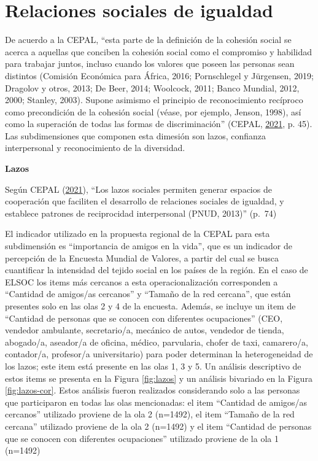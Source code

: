 \documentclass[
  12pt,
]{book}
\begin{document}
\hypertarget{relaciones-sociales-de-igualdad}{%
\section{Relaciones sociales de igualdad}\label{relaciones-sociales-de-igualdad}}

De acuerdo a la CEPAL, ``esta parte de la definición de la cohesión social se acerca a aquellas que conciben la cohesión social como el compromiso y habilidad para trabajar juntos, incluso cuando los valores que poseen las personas sean distintos (Comisión Económica para África, 2016; Pornschlegel y Jürgensen, 2019; Dragolov y otros, 2013; De Beer, 2014; Woolcock, 2011; Banco Mundial, 2012, 2000; Stanley, 2003). Supone asimismo el principio de reconocimiento recíproco como precondición de la cohesión social (véase, por ejemplo, Jenson, 1998), así como la superación de todas las formas de discriminación'' (CEPAL, \protect\hyperlink{ref-cepal_cohesion_2021}{2021}, p. 45). Las subdimensiones que componen esta dimesión son lazos, confianza interpersonal y reconocimiento de la diversidad.

\textbf{Lazos}

Según CEPAL (\protect\hyperlink{ref-cepal_cohesion_2021}{2021}), ``Los lazos sociales permiten generar espacios de cooperación que faciliten el desarrollo de relaciones sociales de igualdad, y establece patrones de reciprocidad interpersonal (PNUD, 2013)'' (p.~74)

El indicador utilizado en la propuesta regional de la CEPAL para esta subdimensión es ``importancia de amigos en la vida'', que es un indicador de percepción de la Encuesta Mundial de Valores, a partir del cual se busca cuantificar la intensidad del tejido social en los países de la región. En el caso de ELSOC los items más cercanos a esta operacionalización corresponden a ``Cantidad de amigos/as cercanos'' y ``Tamaño de la red cercana'', que están presentes solo en las olas 2 y 4 de la encuesta. Además, se incluye un item de ``Cantidad de personas que se conocen con diferentes ocupaciones'' (CEO, vendedor ambulante, secretario/a, mecánico de autos, vendedor de tienda, abogado/a, aseador/a de oficina, médico, parvularia, chofer de taxi, camarero/a, contador/a, profesor/a universitario) para poder determinan la heterogeneidad de los lazos; este item está presente en las olas 1, 3 y 5. Un análisis descriptivo de estos items se presenta en la Figura \ref{fig:lazos} y un análisis bivariado en la Figura \ref{fig:lazos-cor}. Estos análisis fueron realizados considerando solo a las personas que participaron en todas las olas mencionadas: el item ``Cantidad de amigos/as cercanos'' utilizado proviene de la ola 2 (n=1492), el item ``Tamaño de la red cercana'' utilizado proviene de la ola 2 (n=1492) y el item ``Cantidad de personas que se conocen con diferentes ocupaciones'' utilizado proviene de la ola 1 (n=1492)
\end{document}
